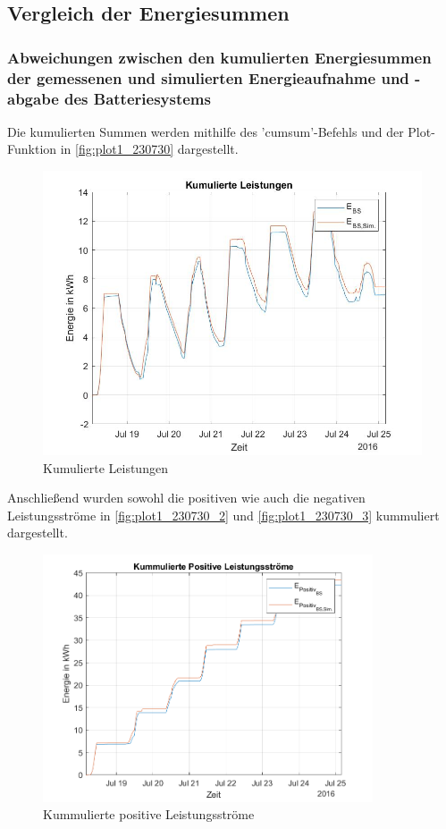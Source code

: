 \subsection{Vergleich der Energiesummen}
\subsubsection{Abweichungen zwischen den kumulierten Energiesummen der gemessenen und
simulierten Energieaufnahme und -abgabe des Batteriesystems}
Die kumulierten Summen werden mithilfe des 'cumsum'-Befehls und der Plot-Funktion in \autoref{fig:plot1_230730} dargestellt.

\begin{figure}[H]
    \centering
    \includegraphics[width=\textwidth]{Abbildungen/kummulierteleistungen.jpg}
    \caption{Kumulierte Leistungen}
    \label{fig:plot1_230730}
\end{figure}
\newpage
Anschließend wurden sowohl die positiven wie auch die negativen Leistungsströme in \autoref{fig:plot1_230730_2} und \autoref{fig:plot1_230730_3} kummuliert dargestellt.
\begin{figure}[H]
    \centering
    \includegraphics[width=0.87\textwidth]{Abbildungen/plot5.png}
    \caption{Kummulierte positive Leistungsströme}
    \label{fig:plot1_230730_2}
\end{figure}

